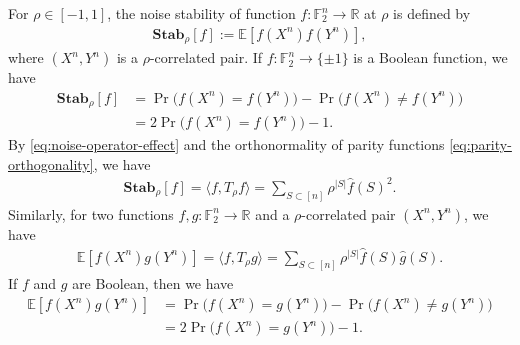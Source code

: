 \documentclass[journal,draftcls, onecolumn]{IEEEtran}
\begin{document}
For $\rho \in [-1,1]$, the noise stability of function $f:\mathbb{F}_2^n \to \mathbb{R}$ at $\rho$ is defined by
\begin{align*}
\mathbf{Stab}_\rho[f] := \mathbb{E}[ f(X^n) f(Y^n)], 
\end{align*}
where $(X^n,Y^n)$ is a $\rho$-correlated pair. 
If $f:\mathbb{F}_2^n \to \{\pm 1\}$ is a Boolean function, we have
\begin{align*}
\mathbf{Stab}_\rho[f] &= \Pr\big( f(X^n) = f(Y^n) \big) - \Pr\big( f(X^n) \neq f(Y^n) \big) \\
&= 2 \Pr\big( f(X^n) = f(Y^n) \big) -1.
\end{align*}
By \eqref{eq:noise-operator-effect} and the orthonormality of parity functions \eqref{eq:parity-orthogonality}, we have
\begin{align}
\mathbf{Stab}_\rho[f] = \langle f, T_\rho f \rangle = \sum_{S \subset [n]} \rho^{|S|} \widehat{f}(S)^2.
\end{align}
Similarly, for two functions $f,g: \mathbb{F}_2^n \to \mathbb{R}$ and a $\rho$-correlated pair $(X^n,Y^n)$, we have
\begin{align}
\mathbb{E}[f(X^n) g(Y^n)] = \langle f, T_\rho g \rangle = \sum_{S \subset [n]} \rho^{|S|} \widehat{f}(S) \widehat{g}(S).
\end{align}
If $f$ and $g$ are Boolean, then we have
\begin{align}
\mathbb{E}[f(X^n) g(Y^n)] &=  \Pr\big( f(X^n) = g(Y^n) \big) - \Pr\big( f(X^n) \neq g(Y^n) \big) \\
&= 2 \Pr\big( f(X^n) = g(Y^n) \big) -1.
\end{align}
\end{document}
